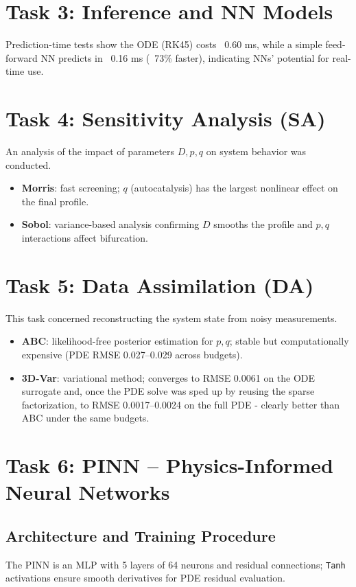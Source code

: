 \documentclass[a4paper,11pt]{article}
\begin{document}
\section{Task 3: Inference and NN Models}
Prediction-time tests show the ODE (RK45) costs ~0.60 ms, while a simple feed-forward NN predicts in ~0.16 ms (~73\% faster), indicating NNs' potential for real-time use.

\section{Task 4: Sensitivity Analysis (SA)}
An analysis of the impact of parameters $D,p,q$ on system behavior was conducted.
\begin{itemize}
    \item \textbf{Morris}: fast screening; $q$ (autocatalysis) has the largest nonlinear effect on the final profile.
    \item \textbf{Sobol}: variance-based analysis confirming $D$ smooths the profile and $p,q$ interactions affect bifurcation.
\end{itemize}

\section{Task 5: Data Assimilation (DA)}
This task concerned reconstructing the system state from noisy measurements.
\begin{itemize}
    \item \textbf{ABC}: likelihood-free posterior estimation for $p,q$; stable but computationally expensive (PDE RMSE 0.027--0.029 across budgets).
    \item \textbf{3D-Var}: variational method; converges to RMSE 0.0061 on the ODE surrogate and, once the PDE solve was sped up by reusing the sparse factorization, to RMSE 0.0017--0.0024 on the full PDE - clearly better than ABC under the same budgets.
\end{itemize}

\section{Task 6: PINN -- Physics-Informed Neural Networks}
\subsection{Architecture and Training Procedure}
The PINN is an MLP with 5 layers of 64 neurons and residual connections; \texttt{Tanh} activations ensure smooth derivatives for PDE residual evaluation.
\end{document}

